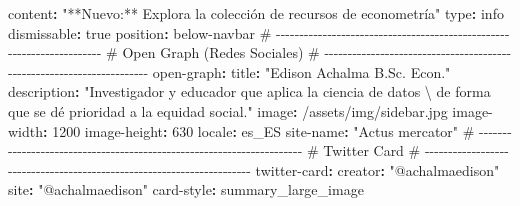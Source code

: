 \documentclass[
  doc,
  floatsintext,
  longtable,
  a4paper,
  nolmodern,
  notxfonts,
  notimes,
  12pt,
  colorlinks=true,linkcolor=blue,citecolor=blue,urlcolor=blue]{apa7}
\newenvironment{Shaded}{\begin{snugshade}}{\end{snugshade}}
\newcommand{\AttributeTok}[1]{\textcolor[rgb]{0.40,0.45,0.13}{#1}}
\newcommand{\CharTok}[1]{\textcolor[rgb]{0.13,0.47,0.30}{#1}}
\newcommand{\CommentTok}[1]{\textcolor[rgb]{0.37,0.37,0.37}{#1}}
\newcommand{\DecValTok}[1]{\textcolor[rgb]{0.68,0.00,0.00}{#1}}
\newcommand{\FunctionTok}[1]{\textcolor[rgb]{0.28,0.35,0.67}{#1}}
\newcommand{\KeywordTok}[1]{\textcolor[rgb]{0.00,0.23,0.31}{\textbf{#1}}}
\newcommand{\StringTok}[1]{\textcolor[rgb]{0.13,0.47,0.30}{#1}}
\begin{document}
\begin{Shaded}
\begin{Highlighting}[]
\AttributeTok{    }\FunctionTok{content}\KeywordTok{:}\AttributeTok{ }\StringTok{"**Nuevo:** Explora la colección de recursos de econometría"}
\AttributeTok{    }\FunctionTok{type}\KeywordTok{:}\AttributeTok{ info}
\AttributeTok{    }\FunctionTok{dismissable}\KeywordTok{:}\AttributeTok{ }\CharTok{true}
\AttributeTok{    }\FunctionTok{position}\KeywordTok{:}\AttributeTok{ below{-}navbar}
\AttributeTok{  }
\CommentTok{  \# {-}{-}{-}{-}{-}{-}{-}{-}{-}{-}{-}{-}{-}{-}{-}{-}{-}{-}{-}{-}{-}{-}{-}{-}{-}{-}{-}{-}{-}{-}{-}{-}{-}{-}{-}{-}{-}{-}{-}{-}{-}{-}{-}{-}{-}{-}{-}{-}{-}{-}{-}{-}{-}{-}{-}{-}{-}{-}{-}{-}{-}{-}{-}{-}{-}{-}{-}{-}{-}{-}}
\CommentTok{  \# Open Graph (Redes Sociales)}
\CommentTok{  \# {-}{-}{-}{-}{-}{-}{-}{-}{-}{-}{-}{-}{-}{-}{-}{-}{-}{-}{-}{-}{-}{-}{-}{-}{-}{-}{-}{-}{-}{-}{-}{-}{-}{-}{-}{-}{-}{-}{-}{-}{-}{-}{-}{-}{-}{-}{-}{-}{-}{-}{-}{-}{-}{-}{-}{-}{-}{-}{-}{-}{-}{-}{-}{-}{-}{-}{-}{-}{-}{-}}
\AttributeTok{  }\FunctionTok{open{-}graph}\KeywordTok{:}
\AttributeTok{    }\FunctionTok{title}\KeywordTok{:}\AttributeTok{ }\StringTok{"Edison Achalma B.Sc. Econ."}
\AttributeTok{    }\FunctionTok{description}\KeywordTok{:}\AttributeTok{ }\StringTok{"Investigador y educador que aplica la ciencia de datos \textbackslash{}}
\StringTok{    de forma que se dé prioridad a la equidad social."}
\AttributeTok{    }\FunctionTok{image}\KeywordTok{:}\AttributeTok{ /assets/img/sidebar.jpg}
\AttributeTok{    }\FunctionTok{image{-}width}\KeywordTok{:}\AttributeTok{ }\DecValTok{1200}
\AttributeTok{    }\FunctionTok{image{-}height}\KeywordTok{:}\AttributeTok{ }\DecValTok{630}
\AttributeTok{    }\FunctionTok{locale}\KeywordTok{:}\AttributeTok{ es\_ES}
\AttributeTok{    }\FunctionTok{site{-}name}\KeywordTok{:}\AttributeTok{ }\StringTok{"Actus mercator"}
\AttributeTok{  }
\CommentTok{  \# {-}{-}{-}{-}{-}{-}{-}{-}{-}{-}{-}{-}{-}{-}{-}{-}{-}{-}{-}{-}{-}{-}{-}{-}{-}{-}{-}{-}{-}{-}{-}{-}{-}{-}{-}{-}{-}{-}{-}{-}{-}{-}{-}{-}{-}{-}{-}{-}{-}{-}{-}{-}{-}{-}{-}{-}{-}{-}{-}{-}{-}{-}{-}{-}{-}{-}{-}{-}{-}{-}}
\CommentTok{  \# Twitter Card}
\CommentTok{  \# {-}{-}{-}{-}{-}{-}{-}{-}{-}{-}{-}{-}{-}{-}{-}{-}{-}{-}{-}{-}{-}{-}{-}{-}{-}{-}{-}{-}{-}{-}{-}{-}{-}{-}{-}{-}{-}{-}{-}{-}{-}{-}{-}{-}{-}{-}{-}{-}{-}{-}{-}{-}{-}{-}{-}{-}{-}{-}{-}{-}{-}{-}{-}{-}{-}{-}{-}{-}{-}{-}}
\AttributeTok{  }\FunctionTok{twitter{-}card}\KeywordTok{:}
\AttributeTok{    }\FunctionTok{creator}\KeywordTok{:}\AttributeTok{ }\StringTok{"@achalmaedison"}
\AttributeTok{    }\FunctionTok{site}\KeywordTok{:}\AttributeTok{ }\StringTok{"@achalmaedison"}
\AttributeTok{    }\FunctionTok{card{-}style}\KeywordTok{:}\AttributeTok{ summary\_large\_image}

\end{Highlighting}
\end{Shaded}
\end{document}
